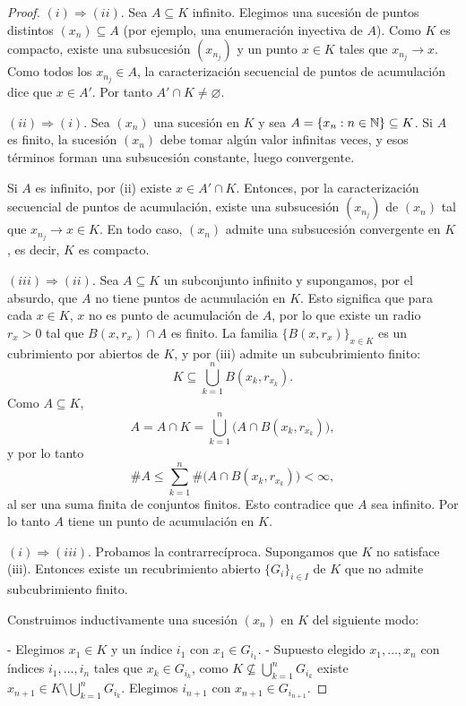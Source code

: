 \begin{proof}
$(i) \Rightarrow (ii)$.
Sea $A\subseteq K$ infinito. Elegimos una sucesión de puntos distintos
$(x_n)\subseteq A$ (por ejemplo, una enumeración inyectiva de $A$).
Como $K$ es compacto, existe una subsucesión $(x_{n_j})$ y un punto
$x\in K$ tales que $x_{n_j}\to x$. Como todos los $x_{n_j}\in A$, la
caracterización secuencial de puntos de acumulación dice que $x\in A'$.
Por tanto $A'\cap K\neq \varnothing$.

\medskip

$(ii) \Rightarrow (i)$.
Sea $(x_n)$ una sucesión en $K$ y sea $A=\{x_n:n\in\mathbb{N}\}\subseteq K$.
Si $A$ es finito, la sucesión $(x_n)$ debe tomar algún valor infinitas
veces, y esos términos forman una subsucesión constante, luego
convergente.

Si $A$ es infinito, por (ii) existe $x\in A'\cap K$. Entonces, por la
caracterización secuencial de puntos de acumulación, existe una
subsucesión $(x_{n_j})$ de $(x_n)$ tal que $x_{n_j}\to x\in K$.
En todo caso, $(x_n)$ admite una subsucesión convergente en $K$, es
decir, $K$ es compacto.

\medskip

$(iii) \Rightarrow (ii)$.
Sea $A\subseteq K$ un subconjunto infinito y supongamos, por el absurdo,
que $A$ no tiene puntos de acumulación en $K$. Esto significa que para
cada $x\in K$, $x$ no es punto de acumulación de $A$, por lo que existe
un radio $r_x>0$ tal que $B(x,r_x)\cap A$ es finito. La familia
$\{B(x,r_x)\}_{x\in K}$ es un cubrimiento por abiertos de $K$, y por
(iii) admite un subcubrimiento finito:
\[
K \subseteq \bigcup_{k=1}^n B(x_k,r_{x_k}).
\]
Como $A\subseteq K$,
\[
A = A\cap K = \bigcup_{k=1}^n \bigl(A\cap B(x_k,r_{x_k})\bigr),
\]
y por lo tanto
\[
\#A \le \sum_{k=1}^n \#\bigl(A\cap B(x_k,r_{x_k})\bigr) < \infty,
\]
al ser una suma finita de conjuntos finitos. Esto contradice que $A$ sea
infinito. Por lo tanto $A$ tiene un punto de acumulación en $K$.

\medskip

$(i) \Rightarrow (iii)$.
Probamos la contrarrecíproca. Supongamos que $K$ no satisface (iii).
Entonces existe un recubrimiento abierto $\{G_i\}_{i\in I}$ de $K$
que no admite subcubrimiento finito.

Construimos inductivamente una sucesión $(x_n)$ en $K$ del siguiente modo:

- Elegimos $x_1\in K$ y un índice $i_1$ con $x_1\in G_{i_1}$.
- Supuesto elegido $x_1,\dots,x_n$ con índices $i_1,\dots,i_n$ tales
  que $x_k\in G_{i_k}$, como
  \(
    K \nsubseteq \bigcup_{k=1}^n G_{i_k}
  \)
  existe
  \(
    x_{n+1}\in K \setminus \bigcup_{k=1}^n G_{i_k}.
  \)
  Elegimos $i_{n+1}$ con $x_{n+1}\in G_{i_{n+1}}$.


\end{proof}

